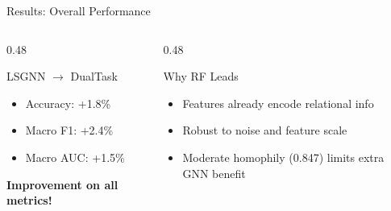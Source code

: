 \documentclass[aspectratio=169, 10pt]{beamer}
\begin{document}
\begin{frame}{Results: Overall Performance}
\begin{columns}[T]
\begin{column}{0.48\textwidth}
\begin{exampleblock}{LSGNN $\to$ DualTask}
\begin{itemize}
    \item Accuracy: +1.8\%
    \item Macro F1: +2.4\%
    \item Macro AUC: +1.5\%
\end{itemize}
\textbf{Improvement on all metrics!}
\end{exampleblock}
\end{column}
\begin{column}{0.48\textwidth}
\begin{alertblock}{Why RF Leads}
\begin{itemize}
    \item Features already encode relational info
    \item Robust to noise and feature scale
    \item Moderate homophily (0.847) limits extra GNN benefit
\end{itemize}
\end{alertblock}
\end{column}
\end{columns}
\end{frame}
\end{document}
